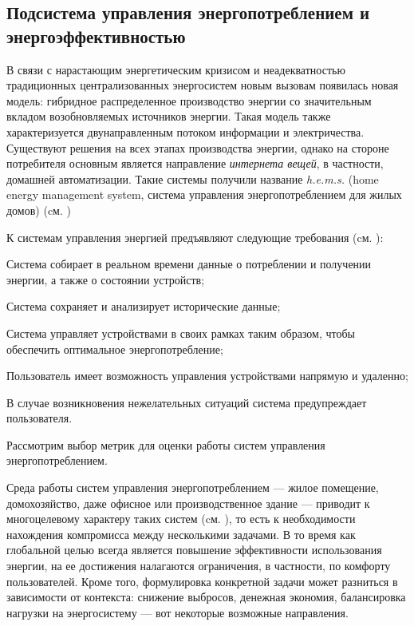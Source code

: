 \subsection{Подсистема управления энергопотреблением и энергоэффективностью}
\label{sec_SH_energy_building_control_subsystem}

В связи с нарастающим энергетическим кризисом и неадекватностью традиционных централизованных энергосистем новым вызовам появилась новая модель: гибридное распределенное производство энергии со значительным вкладом возобновляемых источников энергии. Такая модель также характеризуется двунаправленным потоком информации и электричества. Существуют решения на всех этапах производства энергии, однако на стороне потребителя основным является направление \textit{интернета вещей}, в частности, домашней автоматизации. Такие системы получили название \textit{h.e.m.s.} (home energy management system, система управления энергопотреблением для жилых домов) (cм. )

К системам управления энергией предъявляют следующие требования (cм. ):

\begin{textitemize}
	\item Система собирает в реальном времени данные о потреблении и получении энергии, а также о состоянии устройств;
	\item Система сохраняет и анализирует исторические данные;
	\item Система управляет устройствами в своих рамках таким образом, чтобы обеспечить оптимальное энергопотребление;
	\item Пользователь имеет возможность управления устройствами напрямую и удаленно;
	\item В случае возникновения нежелательных ситуаций система предупреждает пользователя.
\end{textitemize}

Рассмотрим выбор метрик для оценки работы систем управления энергопотреблением.

Среда работы систем управления энергопотреблением --- жилое помещение, домохозяйство, даже офисное или производственное здание --- приводит к многоцелевому характеру таких систем (cм. ), то есть к необходимости нахождения компромисса между несколькими задачами. В то время как глобальной целью всегда является повышение эффективности использования энергии, на ее достижения налагаются ограничения, в частности, по комфорту пользователей. Кроме того, формулировка конкретной задачи может разниться в зависимости от контекста: снижение выбросов, денежная экономия, балансировка нагрузки на энергосистему — вот некоторые возможные направления.

